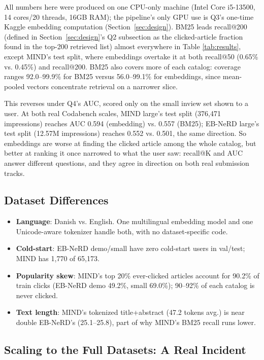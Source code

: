 \documentclass[11pt]{article}
\begin{document}
All numbers here were produced on one CPU-only machine (Intel Core i5-13500, 14 cores/20
threads, 16GB RAM); the pipeline's only GPU use is Q3's one-time Kaggle embedding computation
(Section~\ref{sec:design}). BM25 leads recall@200 (defined in Section~\ref{sec:design}'s Q2
subsection as the clicked-article fraction found in the top-200 retrieved list) almost
everywhere in Table \ref{tab:results}, except MIND's test split, where embeddings overtake it at
both recall@50 (0.65\% vs. 0.45\%) and recall@200. BM25 also covers more of each catalog:
coverage ranges 92.0--99.9\% for BM25 versus 56.0--99.1\% for embeddings, since mean-pooled
vectors concentrate retrieval on a narrower slice.

This reverses under Q4's AUC, scored only on the small inview set shown to a user. At both real
Codabench scales, MIND large's test split (376,471 impressions) reaches AUC 0.594 (embedding)
vs. 0.557 (BM25); EB-NeRD large's test split (12.57M impressions) reaches 0.552 vs. 0.501, the
same direction. So embeddings are worse at finding the clicked article among the whole catalog,
but better at ranking it once narrowed to what the user saw: recall@K and AUC answer different
questions, and they agree in direction on both real submission tracks.

\subsection{Dataset Differences}

\begin{itemize}
    \item \textbf{Language}: Danish vs. English. One multilingual embedding model and one
    Unicode-aware tokenizer handle both, with no dataset-specific code.
    \item \textbf{Cold-start}: EB-NeRD demo/small have zero cold-start users in val/test; MIND
    has 1,770 of 65,173.
    \item \textbf{Popularity skew}: MIND's top 20\% ever-clicked articles account for 90.2\% of
    train clicks (EB-NeRD demo 49.2\%, small 69.0\%); 90--92\% of each catalog is never clicked.
    \item \textbf{Text length}: MIND's tokenized title+abstract (47.2 tokens avg.) is near double
    EB-NeRD's (25.1--25.8), part of why MIND's BM25 recall runs lower.
\end{itemize}

\subsection{Scaling to the Full Datasets: A Real Incident}
\label{sec:incident}
\end{document}
